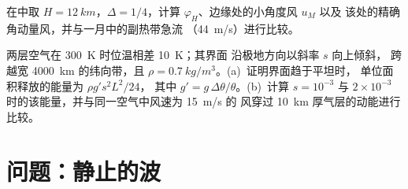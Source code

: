 \begin{exercise}[$\star\star\star$]\label{exo:b3:atmospheric-dynamics:11}
在中取 $H = \qty{12}{km}$，$\Delta = 1/4$，计算
$\varphi_H$、边缘处的小角度风 $u_M$ 以及
该处的精确角动量风，并与一月中的副热带急流
（\qty{44}{m/s}）进行比较。
\end{exercise}

\begin{exercise}[$\star\star\star$]\label{exo:b3:atmospheric-dynamics:12}
两层空气在 \qty{300}{K} 时位温相差 \qty{10}{K}；其界面
沿极地方向以斜率 $s$ 向上倾斜，
跨越宽 \qty{4000}{km} 的纬向带，且 $\rho = \qty{0.7}{kg/m^3}$。(a)~证明界面趋于平坦时，
单位面积释放的能量为 $\rho g' s^2L^2/24$，
其中 $g' = g\,\Delta\theta/\theta$。(b)~计算 $s = 10^{-3}$ 与
$2\times10^{-3}$ 时的该能量，并与同一空气中风速为 \qty{15}{m/s} 的
风穿过 \qty{10}{km} 厚气层的动能进行比较。
\end{exercise}

\section{问题：静止的波}

